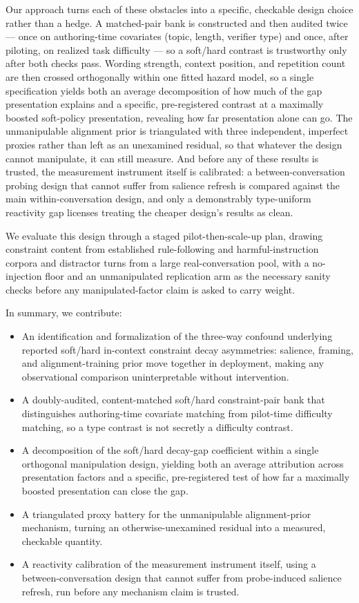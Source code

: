 \documentclass[11pt]{article}
\begin{document}
Our approach turns each of these obstacles into a specific, checkable design choice rather than a hedge. A matched-pair bank is constructed and then audited twice --- once on authoring-time covariates (topic, length, verifier type) and once, after piloting, on realized task difficulty --- so a soft/hard contrast is trustworthy only after both checks pass. Wording strength, context position, and repetition count are then crossed orthogonally within one fitted hazard model, so a single specification yields both an average decomposition of how much of the gap presentation explains and a specific, pre-registered contrast at a maximally boosted soft-policy presentation, revealing how far presentation alone can go. The unmanipulable alignment prior is triangulated with three independent, imperfect proxies rather than left as an unexamined residual, so that whatever the design cannot manipulate, it can still measure. And before any of these results is trusted, the measurement instrument itself is calibrated: a between-conversation probing design that cannot suffer from salience refresh is compared against the main within-conversation design, and only a demonstrably type-uniform reactivity gap licenses treating the cheaper design's results as clean.

We evaluate this design through a staged pilot-then-scale-up plan, drawing constraint content from established rule-following and harmful-instruction corpora and distractor turns from a large real-conversation pool, with a no-injection floor and an unmanipulated replication arm as the necessary sanity checks before any manipulated-factor claim is asked to carry weight.

In summary, we contribute:
\begin{itemize}[leftmargin=1.4em]
\item An identification and formalization of the three-way confound underlying reported soft/hard in-context constraint decay asymmetries: salience, framing, and alignment-training prior move together in deployment, making any observational comparison uninterpretable without intervention.
\item A doubly-audited, content-matched soft/hard constraint-pair bank that distinguishes authoring-time covariate matching from pilot-time difficulty matching, so a type contrast is not secretly a difficulty contrast.
\item A decomposition of the soft/hard decay-gap coefficient within a single orthogonal manipulation design, yielding both an average attribution across presentation factors and a specific, pre-registered test of how far a maximally boosted presentation can close the gap.
\item A triangulated proxy battery for the unmanipulable alignment-prior mechanism, turning an otherwise-unexamined residual into a measured, checkable quantity.
\item A reactivity calibration of the measurement instrument itself, using a between-conversation design that cannot suffer from probe-induced salience refresh, run before any mechanism claim is trusted.
\end{itemize}
\end{document}
